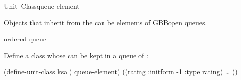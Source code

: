 \documentclass[10pt,twoside,english,pdftex]{article}
\begin{document}

\begin{functiondoc}{Unit~Class}{queue-element}{}
%
%
  
\fnsyntax

\fnpackage {}

\fnmodule {}

\fndescription Objects that inherit from the 
 can be elements of GBBopen queues.

\begin{alsos}{ordered-queue}
\also[on-queue-p]
\also[queue]
\end{alsos}

\fnexample 
{}%
%
Define a  class whose  can be kept in a
queue of :
%
\W\supp
\begin{example}
  (define-unit-class ksa ( queue-element)
    ((rating
      :initform -1
      :type rating)
      \textrm{\ldots{}} ))
\end{example}

\end{functiondoc}

\end{document}
